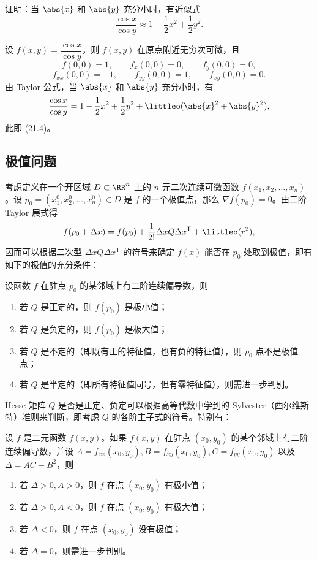 \begin{xexample}[21.3.4]
证明：当 $\abs{x}$ 和 $\abs{y}$ 充分小时，有近似式
\begin{equation}
  \frac{\cos x}{\cos y}\approx1-\frac12x^2+\frac12y^2.
  \tag{21.4}
  \label{eq:21.4}
\end{equation}
\end{xexample}
\begin{xproof}
设 $f(x,y)=\dfrac{\cos x}{\cos y}$，则 $f(x,y)$ 在原点附近无穷次可微，且
\[
  f(0,0)=1,\qquad f_x(0,0)=0,\qquad f_y(0,0)=0,
\]
\[
  f_{xx}(0,0)=-1,\qquad f_{yy}(0,0)=1,\qquad f_{xy}(0,0)=0.
\]
由 Taylor 公式，当 $\abs{x}$ 和 $\abs{y}$ 充分小时，有
\[
  \frac{\cos x}{\cos y}=1-\frac12x^2+\frac12y^2+\littleo(\abs{x}^2+\abs{y}^2),
\]
此即 (21.4)。
\end{xproof}

\subsection{极值问题}

考虑定义在一个开区域 $D\subset\RR^n$ 上的 $n$ 元二次连续可微函数 $f(x_1,x_2,\ldots,x_n)$。设 $p_0=(x_1^0,x_2^0,\ldots,x_n^0)\in D$ 是 $f$ 的一个极值点，那么 $\nabla f(p_0)=0$。由二阶 Taylor 展式得
\[
  f(p_0+\Delta x)=f(p_0)+\frac1{2!}\Delta xQ\Delta x^{\mathsf T}+\littleo(r^2),
\]
因而可以根据二次型 $\Delta xQ\Delta x^{\mathsf T}$ 的符号来确定 $f(x)$ 能否在 $p_0$ 处取到极值，即有如下的极值的充分条件：

设函数 $f$ 在驻点 $p_0$ 的某邻域上有二阶连续偏导数，则
\begin{enumerate}[label=(\arabic*)]
  \item 若 $Q$ 是正定的，则 $f(p_0)$ 是极小值；
  \item 若 $Q$ 是负定的，则 $f(p_0)$ 是极大值；
  \item 若 $Q$ 是不定的（即既有正的特征值，也有负的特征值），则 $p_0$ 点不是极值点；
  \item 若 $Q$ 是半定的（即所有特征值同号，但有零特征值），则需进一步判别。
\end{enumerate}

\begin{xremark}
Hesse 矩阵 $Q$ 是否是正定、负定可以根据高等代数中学到的 Sylvester（西尔维斯特）准则来判断，即考虑 $Q$ 的各阶主子式的符号。特别有：

设 $f$ 是二元函数 $f(x,y)$。如果 $f(x,y)$ 在驻点 $(x_0,y_0)$ 的某个邻域上有二阶连续偏导数，并设 $A=f_{xx}(x_0,y_0),B=f_{xy}(x_0,y_0),C=f_{yy}(x_0,y_0)$ 以及 $\Delta=AC-B^2$，则
\begin{enumerate}[label=(\arabic*)]
  \item 若 $\Delta>0,A>0$，则 $f$ 在点 $(x_0,y_0)$ 有极小值；
  \item 若 $\Delta>0,A<0$，则 $f$ 在点 $(x_0,y_0)$ 有极大值；
  \item 若 $\Delta<0$，则 $f$ 在点 $(x_0,y_0)$ 没有极值；
  \item 若 $\Delta=0$，则需进一步判别。
\end{enumerate}
\end{xremark}

